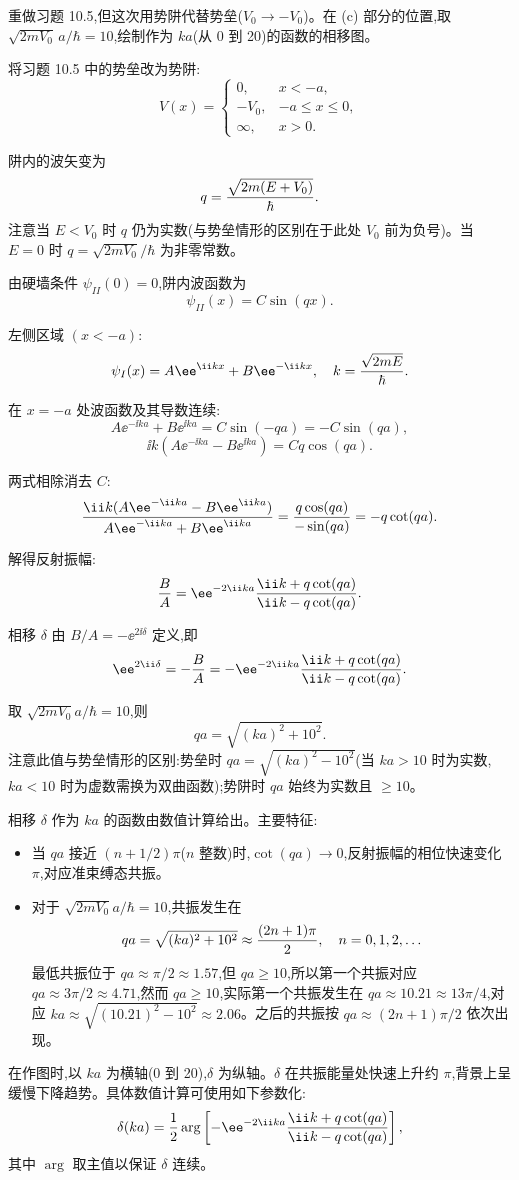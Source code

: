 \begin{question}
重做习题 10.5,但这次用势阱代替势垒($V_0\to -V_0$)。在 (c) 部分的位置,取 $\sqrt{2mV_0}\,a/\hbar=10$,绘制作为 $ka$(从 0 到 20)的函数的相移图。
\begin{solution}
将习题 10.5 中的势垒改为势阱:
\[
V(x)=\begin{cases}
0,&x<-a,\\
-V_0,&-a\le x\le 0,\\
\infty,&x>0.
\end{cases}
\]

阱内的波矢变为
\[
q={\sqrt{2m(E+V_0)}\over\hbar}.
\]
注意当 $E<V_0$ 时 $q$ 仍为实数(与势垒情形的区别在于此处 $V_0$ 前为负号)。当 $E=0$ 时 $q=\sqrt{2mV_0}/\hbar$ 为非零常数。

由硬墙条件 $\psi_{II}(0)=0$,阱内波函数为
\[
\psi_{II}(x)=C\sin(qx).
\]

左侧区域 $(x<-a)$:
\[
\psi_I(x)=A\ee^{\ii kx}+B\ee^{-\ii kx},\quad k={\sqrt{2mE}\over\hbar}.
\]

在 $x=-a$ 处波函数及其导数连续:
\[
A\ee^{-\ii ka}+B\ee^{\ii ka}=C\sin(-qa)=-C\sin(qa),
\]
\[
\ii k(A\ee^{-\ii ka}-B\ee^{\ii ka})=Cq\cos(qa).
\]

两式相除消去 $C$:
\[
{\ii k(A\ee^{-\ii ka}-B\ee^{\ii ka})\over A\ee^{-\ii ka}+B\ee^{\ii ka}}={q\cos(qa)\over-\sin(qa)}=-q\cot(qa).
\]

解得反射振幅:
\[
{B\over A}=\ee^{-2\ii ka}{\ii k+q\cot(qa)\over\ii k-q\cot(qa)}.
\]

相移 $\delta$ 由 $B/A=-\ee^{2\ii\delta}$ 定义,即
\[
\ee^{2\ii\delta}=-{B\over A}=-\ee^{-2\ii ka}{\ii k+q\cot(qa)\over\ii k-q\cot(qa)}.
\]

取 $\sqrt{2mV_0}a/\hbar=10$,则
\[
qa=\sqrt{(ka)^2+10^2}.
\]
注意此值与势垒情形的区别:势垒时 $qa=\sqrt{(ka)^2-10^2}$(当 $ka>10$ 时为实数,$ka<10$ 时为虚数需换为双曲函数);势阱时 $qa$ 始终为实数且 $\ge10$。

相移 $\delta$ 作为 $ka$ 的函数由数值计算给出。主要特征:
\begin{itemize}
\item 当 $q a$ 接近 $(n+1/2)\pi$($n$ 整数)时,$\cot(qa)\to0$,反射振幅的相位快速变化 $\pi$,对应准束缚态共振。
\item 对于 $\sqrt{2mV_0}a/\hbar=10$,共振发生在
\[
qa=\sqrt{(ka)^2+10^2}\approx {(2n+1)\pi\over2},\quad n=0,1,2,\ldots
\]
最低共振位于 $qa\approx\pi/2\approx1.57$,但 $qa\ge10$,所以第一个共振对应 $qa\approx 3\pi/2\approx4.71$,然而 $qa\ge10$,实际第一个共振发生在 $qa\approx 10.21\approx13\pi/4$,对应 $ka\approx\sqrt{(10.21)^2-10^2}\approx2.06$。之后的共振按 $qa\approx (2n+1)\pi/2$ 依次出现。
\end{itemize}

在作图时,以 $ka$ 为横轴(0 到 20),$\delta$ 为纵轴。$\delta$ 在共振能量处快速上升约 $\pi$,背景上呈缓慢下降趋势。具体数值计算可使用如下参数化:
\[
\delta(ka)={1\over2}\arg\left[-\ee^{-2\ii ka}{\ii k+q\cot(qa)\over\ii k-q\cot(qa)}\right],
\]
其中 $\arg$ 取主值以保证 $\delta$ 连续。
\end{solution}
\end{question}
